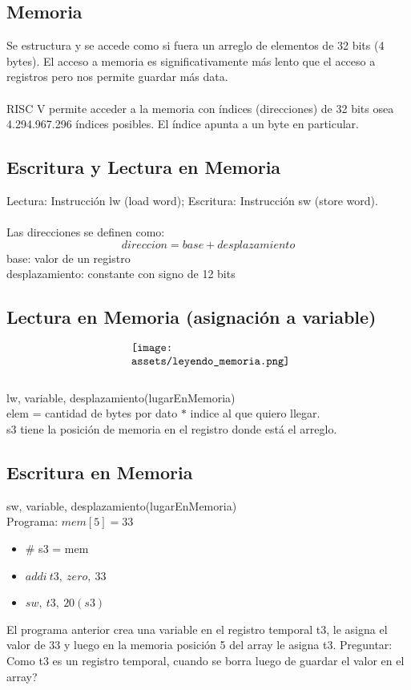 \documentclass[10pt,a4paper]{article}
\begin{document}
\subsection*{Memoria}
Se estructura y se accede como si fuera un arreglo de elementos de 32 bits (4 bytes). El acceso a memoria es significativamente más lento que el acceso a registros pero nos permite guardar más data. \\ \\
RISC V permite acceder a la memoria con índices (direcciones) de 32 bits osea 4.294.967.296 índices posibles. El índice apunta a un byte en particular. \\ \subsection*{Escritura y Lectura en Memoria}
Lectura: Instrucción lw (load word); Escritura: Instrucción sw (store word). \\ \\
Las direcciones se definen como: 
\[direccion = base + desplazamiento\]
base: valor de un registro \\
desplazamiento: constante con signo de 12 bits
\subsection*{Lectura en Memoria (asignación a variable)}
\[\begin{minipage}[b]{0.4\textwidth}
    \texttt{[image: assets/leyendo\_memoria.png]}
    \label{fig:leyendo_memoria}
\end{minipage}\] 
lw, variable, desplazamiento(lugarEnMemoria) \\
elem = cantidad de bytes por dato \(\ast\) indice al que quiero llegar. \\
s3 tiene la posición de memoria en el registro donde está el arreglo. \\
\subsection*{Escritura en Memoria}
sw, variable, desplazamiento(lugarEnMemoria) \\
Programa: \(mem[5] = 33\) 
\begin{itemize}
    \item \# s3 = mem
    \item \(addi \ t3, \ zero,\ 33\)
    \item \(sw, \ t3, \ 20(s3)\)
\end{itemize}
El programa anterior crea una variable en el registro temporal t3, le asigna el valor de 33 y luego en la memoria posición 5 del array le asigna t3.
Preguntar: Como t3 es un registro temporal, cuando se borra luego de guardar el valor en el array? 
\end{document}
